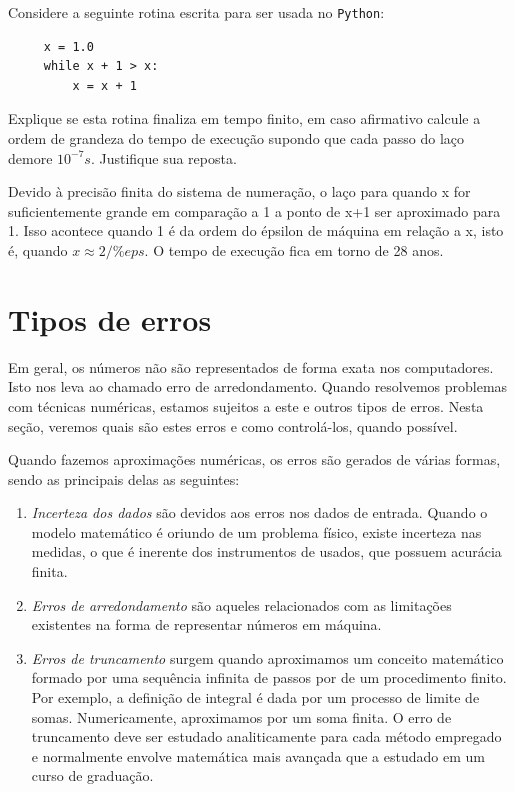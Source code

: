 \ifispython
\begin{exer}Considere a seguinte rotina escrita para ser usada no \verb+Python+:
 \begin{verbatim}
     x = 1.0
     while x + 1 > x:
         x = x + 1
 \end{verbatim}
 Explique se esta rotina finaliza em tempo finito, em caso afirmativo calcule a ordem de grandeza do tempo de execução supondo que cada passo do laço demore $10^{-7}s$. Justifique sua reposta.
 \end{exer}
\begin{resp}
 Devido à precisão finita do sistema de numeração, o laço para quando x for suficientemente grande em comparação a 1 a ponto de x+1 ser aproximado para 1. Isso acontece quando 1 é da ordem do épsilon de máquina em relação a x, isto é, quando $x\approx 2/\%eps$. O tempo de execução fica em torno de 28 anos.
\end{resp}
 \fi


\section{Tipos de erros}

Em geral, os números não são representados de forma exata nos computadores. Isto nos leva ao chamado erro de arredondamento. Quando resolvemos problemas com técnicas numéricas, estamos sujeitos a este e outros tipos de erros. Nesta seção, veremos quais são estes erros e como controlá-los, quando possível.

Quando fazemos aproximações numéricas, os erros são gerados de várias formas, sendo as principais delas as seguintes:
\begin{enumerate}
\item \emph{Incerteza dos dados} são devidos aos erros nos dados de entrada. Quando o modelo matemático é oriundo de um problema físico, existe incerteza nas medidas, o que é inerente dos instrumentos de usados, que possuem acurácia finita.
\item \emph{Erros de arredondamento} são aqueles relacionados com as limitações existentes na forma de representar números em máquina.
\item \emph{Erros de truncamento} surgem quando aproximamos um conceito matemático formado por uma sequência infinita de passos por de um procedimento finito. Por exemplo, a definição de integral é dada por um processo de limite de somas. Numericamente, aproximamos por um soma finita. O erro de truncamento deve ser estudado analiticamente para cada método empregado e normalmente envolve matemática mais avançada que a estudado em um curso de graduação.
\end{enumerate}

